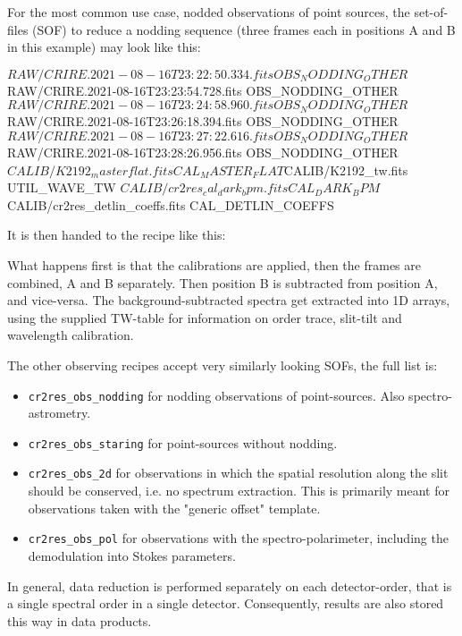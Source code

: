 For the most common use case, nodded observations of point sources, the
set-of-files (SOF) to reduce a nodding sequence (three frames each in positions
A and B in this example) may look like this:
\begin{shell}[fontsize=\small]
$RAW/CRIRE.2021-08-16T23:22:50.334.fits OBS_NODDING_OTHER
$RAW/CRIRE.2021-08-16T23:23:54.728.fits OBS_NODDING_OTHER
$RAW/CRIRE.2021-08-16T23:24:58.960.fits OBS_NODDING_OTHER
$RAW/CRIRE.2021-08-16T23:26:18.394.fits OBS_NODDING_OTHER
$RAW/CRIRE.2021-08-16T23:27:22.616.fits OBS_NODDING_OTHER
$RAW/CRIRE.2021-08-16T23:28:26.956.fits OBS_NODDING_OTHER
$CALIB/K2192_masterflat.fits           CAL_MASTER_FLAT
$CALIB/K2192_tw.fits                   UTIL_WAVE_TW
$CALIB/cr2res_cal_dark_bpm.fits        CAL_DARK_BPM
$CALIB/cr2res_detlin_coeffs.fits       CAL_DETLIN_COEFFS
\end{shell}

It is then handed to the recipe like this:
\begin{shell}[fontsize=\small]
\end{shell}

What happens first is that the calibrations are applied, then the frames are
combined, A and B separately. Then position B is subtracted from position A, and
vice-versa. The background-subtracted spectra get extracted into 1D arrays,
using the supplied TW-table for information on order trace, slit-tilt and
wavelength calibration.

The other observing recipes accept very similarly looking SOFs, the full list
is:
\begin{itemize}
    \item \texttt{cr2res\_obs\_nodding} for nodding observations of
        point-sources. Also spectro-astrometry.
    \item \texttt{cr2res\_obs\_staring} for point-sources without nodding.
    \item \texttt{cr2res\_obs\_2d} for observations in which the spatial
        resolution along the slit should be conserved, i.e. no spectrum
        extraction. This is primarily meant for observations taken with the
        "generic offset" template.
    \item \texttt{cr2res\_obs\_pol} for observations with the
        spectro-polarimeter, including the demodulation into Stokes parameters. 
\end{itemize}


In general, data reduction is performed separately on each detector-order,
that is a single spectral order in a single detector.
Consequently, results are also stored this way in data products.

